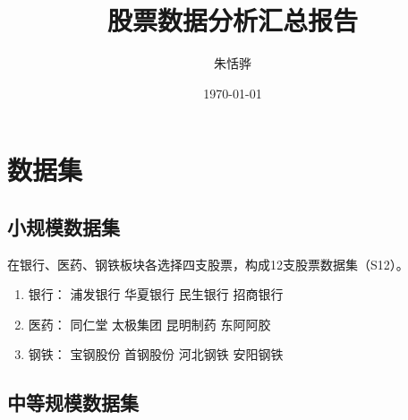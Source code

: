 \documentclass[12pt]{article}
\begin{document}
\title{股票数据分析汇总报告}
\author{朱恬骅}
\date{\today}

\maketitle

\section{数据集}
\subsection{小规模数据集}
在银行、医药、钢铁板块各选择四支股票，构成12支股票数据集（S12）。
\begin{multicols}{2}
\begin{enumerate}
\item 银行：
 浦发银行
 华夏银行
 民生银行
 招商银行
\item 医药：
 同仁堂
 太极集团
 昆明制药
 东阿阿胶
\item 钢铁：
 宝钢股份
 首钢股份
 河北钢铁
 安阳钢铁
\end{enumerate}
\end{multicols}

\subsection{中等规模数据集}
\end{document}
